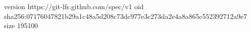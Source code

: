 version https://git-lfs.github.com/spec/v1
oid sha256:07176047821b29a1c48a5d208c73dc977e3c273da2e4a8a865c552392712a9e7
size 195100
